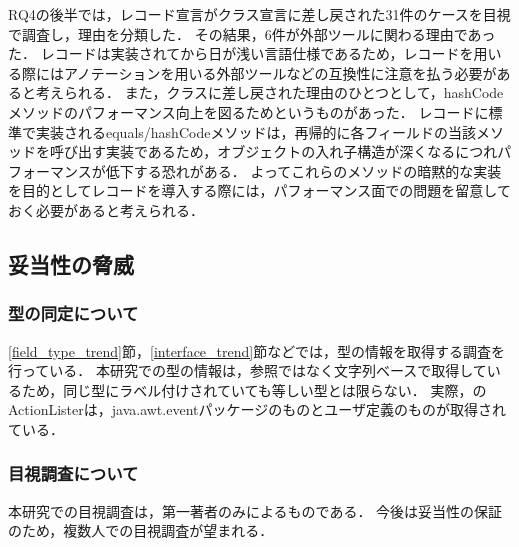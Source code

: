 RQ4の後半では，レコード宣言がクラス宣言に差し戻された31件のケースを目視で調査し，理由を分類した．
その結果，6件が外部ツールに関わる理由であった．
レコードは実装されてから日が浅い言語仕様であるため，レコードを用いる際にはアノテーションを用いる外部ツールなどの互換性に注意を払う必要があると考えられる．
また，クラスに差し戻された理由のひとつとして，hashCodeメソッドのパフォーマンス向上を図るためというものがあった．
レコードに標準で実装されるequals/hashCodeメソッドは，再帰的に各フィールドの当該メソッドを呼び出す実装であるため，オブジェクトの入れ子構造が深くなるにつれパフォーマンスが低下する恐れがある．
よってこれらのメソッドの暗黙的な実装を目的としてレコードを導入する際には，パフォーマンス面での問題を留意しておく必要があると考えられる．

\subsection{妥当性の脅威\label{threats}}
\subsubsection{型の同定について}
\ref{field_type_trend}節，\ref{interface_trend}節などでは，型の情報を取得する調査を行っている．
本研究での型の情報は，参照ではなく文字列ベースで取得しているため，同じ型にラベル付けされていても等しい型とは限らない．
実際，のActionListerは，java.awt.eventパッケージのものとユーザ定義のものが取得されている．

\subsubsection{目視調査について}
本研究での目視調査は，第一著者のみによるものである．
今後は妥当性の保証のため，複数人での目視調査が望まれる．